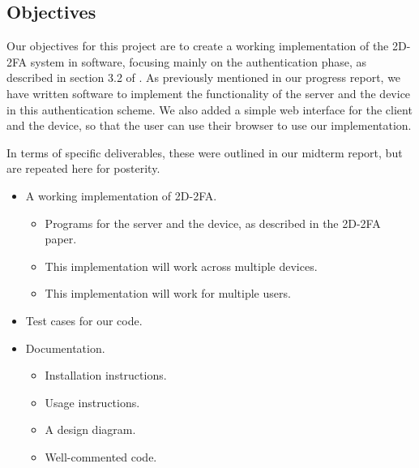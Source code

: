\documentclass[11pt]{article} %
\begin{document}
\subsection{Objectives}

Our objectives for this project are to create a working implementation
of the 2D-2FA system in software, focusing mainly on the authentication
phase, as described in section 3.2 of \cite{shirvanian2d2fa}. As
previously mentioned in our progress report, we have written software to
implement the functionality of the server and the device in this
authentication scheme. We also added a simple web interface for the
client and the device, so that the user can use their browser to use our
implementation. 

In terms of specific deliverables, these were outlined in our midterm
report, but are repeated here for posterity.
\begin{itemize}
    \item A working implementation of 2D-2FA.

    \begin{itemize}
        \item Programs for the server and the device, as described in
        the 2D-2FA paper. 

        \item This implementation will work across multiple devices.

        \item This implementation will work for multiple users.
    \end{itemize}

    \item Test cases for our code.

    \item Documentation.

    \begin{itemize}
        \item Installation instructions.

        \item Usage instructions.

        \item A design diagram.

        \item Well-commented code.
    \end{itemize}
\end{itemize}


\end{document}
